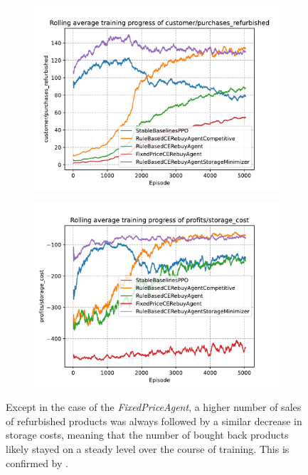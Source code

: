 \begin{figure}[ht]
	\centering
	\begin{subfigure}[t]{0.49\textwidth}
		\centering
		\includegraphics[width = \textwidth]{images/experiments/PPOOligopoly/PPOOligopolyLinePurchasesRefurbished.pdf}\\
		\label{fig:PPOOligopolyLinePurchasesRefurbished}
	\end{subfigure}
	\begin{subfigure}[t]{0.49\textwidth}
		\centering
		\includegraphics[width = \textwidth]{images/experiments/PPOOligopoly/PPOOligopolyLineStorageCosts.pdf}\\
		\label{fig:PPOOligopolyLineStorageCosts}
	\end{subfigure}
	\caption{Except in the case of the \emph{FixedPriceAgent}, a higher number of sales of refurbished products was always followed by a similar decrease in storage costs, meaning that the number of bought back products likely stayed on a steady level over the course of training. This is confirmed by .}\label{fig:PPOOligopolyDiagramsPurchases}
\end{figure}

